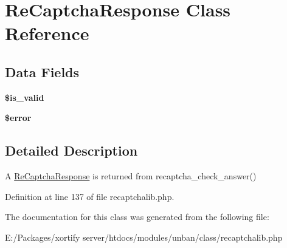 \hypertarget{class_re_captcha_response}{\section{Re\-Captcha\-Response Class Reference}
\label{class_re_captcha_response}
}
\subsection*{Data Fields}
\begin{DoxyCompactItemize}
\item 
\hypertarget{class_re_captcha_response_ad6f49a1afad7f00765edde32634e3c2f}{{\bfseries \$is\-\_\-valid}}\label{class_re_captcha_response_ad6f49a1afad7f00765edde32634e3c2f}

\item 
\hypertarget{class_re_captcha_response_aeba2ab722cedda53dbb7ec1a59f45550}{{\bfseries \$error}}\label{class_re_captcha_response_aeba2ab722cedda53dbb7ec1a59f45550}

\end{DoxyCompactItemize}


\subsection{Detailed Description}
A \hyperlink{class_re_captcha_response}{Re\-Captcha\-Response} is returned from recaptcha\-\_\-check\-\_\-answer() 

Definition at line 137 of file recaptchalib.\-php.



The documentation for this class was generated from the following file\-:\begin{DoxyCompactItemize}
\item 
E\-:/\-Packages/xortify server/htdocs/modules/unban/class/recaptchalib.\-php\end{DoxyCompactItemize}
